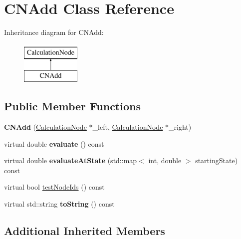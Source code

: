 \hypertarget{classCNAdd}{}\section{C\+N\+Add Class Reference}
\label{classCNAdd}
Inheritance diagram for C\+N\+Add\+:\begin{figure}[H]
\begin{center}
\leavevmode
\includegraphics[height=2.000000cm]{classCNAdd}
\end{center}
\end{figure}
\subsection*{Public Member Functions}
\begin{DoxyCompactItemize}
\item 
{\bfseries C\+N\+Add} (\hyperlink{classCalculationNode}{Calculation\+Node} $\ast$\+\_\+left, \hyperlink{classCalculationNode}{Calculation\+Node} $\ast$\+\_\+right)\hypertarget{classCNAdd_a7dab8d6be3e0fa6d804c3593cb1de715}{}\label{classCNAdd_a7dab8d6be3e0fa6d804c3593cb1de715}

\item 
virtual double {\bfseries evaluate} () const \hypertarget{classCNAdd_a5b558f1853ec5555c1ff3503f44b30e7}{}\label{classCNAdd_a5b558f1853ec5555c1ff3503f44b30e7}

\item 
virtual double {\bfseries evaluate\+At\+State} (std\+::map$<$ int, double $>$ starting\+State) const \hypertarget{classCNAdd_a8c4f9b20da9d50fcdd2ac1211da2eee6}{}\label{classCNAdd_a8c4f9b20da9d50fcdd2ac1211da2eee6}

\item 
virtual bool \hyperlink{classCNAdd_a9ded4aa2b5379606d5d110b8cb05ee05}{test\+Node\+Ids} () const 
\item 
virtual std\+::string {\bfseries to\+String} () const \hypertarget{classCNAdd_a6a29c72a161475af0e05361e6cae49cc}{}\label{classCNAdd_a6a29c72a161475af0e05361e6cae49cc}

\end{DoxyCompactItemize}
\subsection*{Additional Inherited Members}


